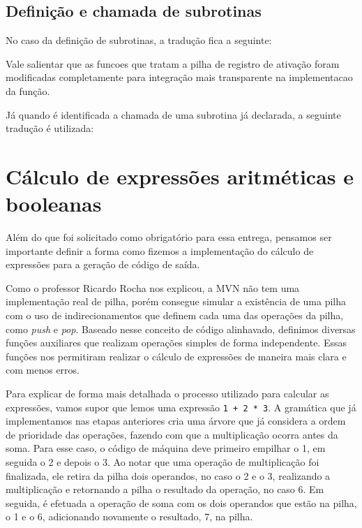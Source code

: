 \subsection{Definição e chamada de subrotinas}
\label{sec:subrotinas}

No caso da definição de subrotinas, a tradução fica a seguinte: 



Vale salientar que as funcoes que tratam a pilha de registro de ativação foram
modificadas completamente para integração mais transparente na implementacao da
função. 

Já quando é identificada a chamada de uma subrotina já declarada, a seguinte tradução é utilizada:




\section{Cálculo de expressões aritméticas e booleanas}
\label{sec:expre}

Além do que foi solicitado como obrigatório para essa entrega, 
pensamos ser importante definir a forma como fizemos a implementação do 
cálculo de expressões para a geração de código de saída.

Como o professor Ricardo Rocha nos explicou, a MVN não tem uma implementação
real de pilha, porém consegue simular a existência de uma pilha com o uso de
indirecionamentos que definem cada uma das operações da pilha, como \emph{push}
e \emph{pop}. Baseado nesse conceito de código alinhavado, definimos diversas
funções auxiliares que realizam operações simples de forma independente. Essas
funções nos permitiram realizar o cálculo de expressões de maneira mais clara e
com menos erros.

Para explicar de forma mais detalhada o processo utilizado para calcular as
expressões, vamos supor que lemos uma expressão \verb=1 + 2 * 3=. A gramática
que já implementamos nas etapas anteriores cria uma árvore que já considera a
ordem de prioridade das operações, fazendo com que a multiplicação ocorra antes
da soma. Para esse caso, o código de máquina deve primeiro empilhar o 1, em
seguida o 2 e depois o 3. Ao notar que uma operação de multiplicação foi
finalizada, ele retira da pilha dois operandos, no caso o 2 e o 3, realizando a
multiplicação e retornando a pilha o resultado da operação, no caso 6. Em
seguida, é efetuada a operação de soma com os dois operandos que estão na
pilha, o 1 e o 6, adicionando novamente o resultado, 7, na pilha.

